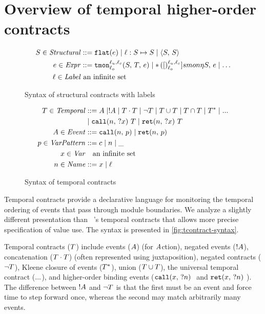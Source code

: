 \documentclass[preprint,onecolumn,9pt]{sigplanconf} %
\begin{document}
\section{Overview of temporal higher-order contracts}

\begin{figure}
  \begin{align*}
    S \in \mathit{Structural} &::= {\tt flat}(e) \mid \ell : S \mapsto S \mid \langle S,\, S\rangle
\\
    e \in \mathit{Expr} &::= {\tt tmon}{^{\ell_u,\ell_c}_{\ell_o}}({S,\,T,\,e})
                    \mid {\tt *}{\,}({[})^{\ell_u,\ell_c}_{\ell_o}]{smon}{\eta}{S,\, e}
                    \mid \ldots
\\
\ell \in \mathit{Label}&\text{ an infinite set} \\
  \end{align*}
  \caption{Syntax of structural contracts with labels}
  \label{fig:scontract-syntax}
\end{figure}

\begin{figure}
  \begin{align*}
 T \in \mathit{Temporal} &::=
      A \mid ! A
 \mid T \cdot T
 \mid \neg T
 \mid T \cup T
 \mid T \cap T
 \mid T^*
 \mid {\tt ...} \\
&\mid {\tt call}(n,\, {\tt ?}x)\ T
 \mid {\tt ret}(n,\, {\tt ?}x)\ T
\\
A \in \mathit{Event} &::= {\tt call}(n,\, p) \mid {\tt ret}(n,\, p) \\
p \in \mathit{VarPattern} &::= c \mid n \mid \_ \\
x \in \mathit{Var} &\quad\text{an infinite set} \\
n \in \mathit{Name} &::= x \mid \ell
  \end{align*}
  \caption{Syntax of temporal contracts}
  \label{fig:tcontract-syntax}
\end{figure}

Temporal contracts provide a declarative language for monitoring the temporal ordering of events that pass through module boundaries.
%
We analyze a slightly different presentation than ~\citep{ianjohnson:dfm:icfp2011}'s temporal contracts that allows more precise specification of value use.
%
The syntax is presented in \autoref{fig:tcontract-syntax}.

Temporal contracts ($T$) include events ($A$) (for $A$ction), negated events ($! A$), concatenation ($T \cdot T$) (often represented using juxtaposition), negated contracts ($\neg T$), Kleene closure of events ($T^*$), union ($T \cup T$), the universal temporal contract (${\tt ...}$), and higher-order binding events ($\stcall{\mvar}{\mname}$ and $\stret{\mvar}{\mname}$).
%
The difference between $! A$ and $\neg T$ is that the first must be an event and force time to step forward once, whereas the second may match arbitrarily many events.
\end{document}
